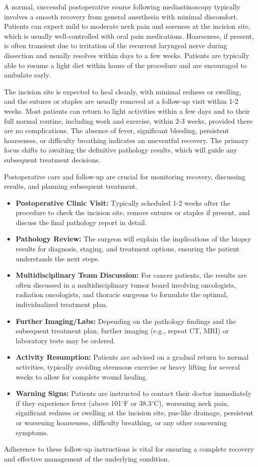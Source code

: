 A normal, successful postoperative course following mediastinoscopy typically involves a smooth recovery from general anesthesia with minimal discomfort. Patients can expect mild to moderate neck pain and soreness at the incision site, which is usually well-controlled with oral pain medications. Hoarseness, if present, is often transient due to irritation of the recurrent laryngeal nerve during dissection and usually resolves within days to a few weeks. Patients are typically able to resume a light diet within hours of the procedure and are encouraged to ambulate early.

The incision site is expected to heal cleanly, with minimal redness or swelling, and the sutures or staples are usually removed at a follow-up visit within 1-2 weeks. Most patients can return to light activities within a few days and to their full normal routine, including work and exercise, within 2-3 weeks, provided there are no complications. The absence of fever, significant bleeding, persistent hoarseness, or difficulty breathing indicates an uneventful recovery. The primary focus shifts to awaiting the definitive pathology results, which will guide any subsequent treatment decisions.

Postoperative care and follow-up are crucial for monitoring recovery, discussing results, and planning subsequent treatment.

\begin{itemize}
  \item \textbf{Postoperative Clinic Visit:} Typically scheduled 1-2 weeks after the procedure to check the incision site, remove sutures or staples if present, and discuss the final pathology report in detail.
  \item \textbf{Pathology Review:} The surgeon will explain the implications of the biopsy results for diagnosis, staging, and treatment options, ensuring the patient understands the next steps.
  \item \textbf{Multidisciplinary Team Discussion:} For cancer patients, the results are often discussed in a multidisciplinary tumor board involving oncologists, radiation oncologists, and thoracic surgeons to formulate the optimal, individualized treatment plan.
  \item \textbf{Further Imaging/Labs:} Depending on the pathology findings and the subsequent treatment plan, further imaging (e.g., repeat CT, MRI) or laboratory tests may be ordered.
  \item \textbf{Activity Resumption:} Patients are advised on a gradual return to normal activities, typically avoiding strenuous exercise or heavy lifting for several weeks to allow for complete wound healing.
  \item \textbf{Warning Signs:} Patients are instructed to contact their doctor immediately if they experience fever (above 101$^{\circ}$F or 38.3$^{\circ}$C), worsening neck pain, significant redness or swelling at the incision site, pus-like drainage, persistent or worsening hoarseness, difficulty breathing, or any other concerning symptoms.
\end{itemize}
Adherence to these follow-up instructions is vital for ensuring a complete recovery and effective management of the underlying condition.

